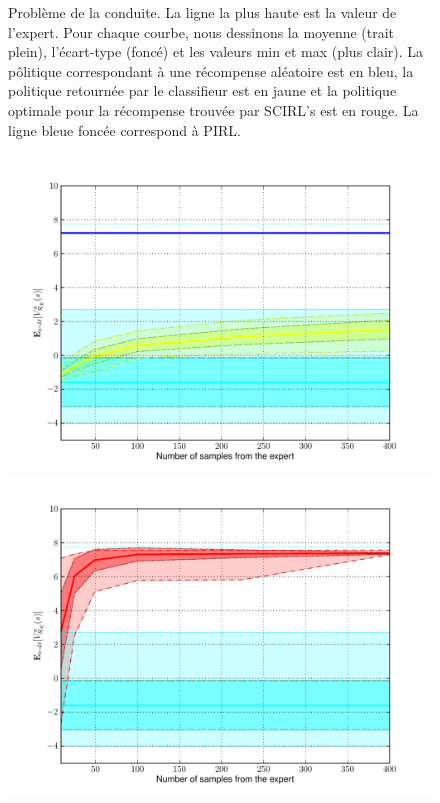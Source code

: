 \documentclass[english,utf8]{./hermes-journal}
\begin{document}
\begin{figure}[fig:res]{Problème de la conduite. La ligne la plus haute est la valeur de l'expert. Pour chaque courbe, nous dessinons la moyenne (trait plein), l'écart-type (foncé) et les valeurs min et max (plus clair). La pôlitique correspondant à une récompense aléatoire est en bleu, la politique retournée par le classifieur est en jaune et la politique optimale pour la récompense trouvée par SCIRL's est en rouge. La ligne bleue foncée correspond à PIRL.}
\begin{minipage}[l]{0.45\linewidth}
\centering
  \centerline{\includegraphics[width=.92\linewidth]{fig_classif.pdf}}
\end{minipage} \hfill
\begin{minipage}[r]{0.45\linewidth}
\centering
  \centerline{\includegraphics[width=.92\linewidth]{fig_scirl.pdf}}
\end{minipage}
\end{figure}
\end{document}
